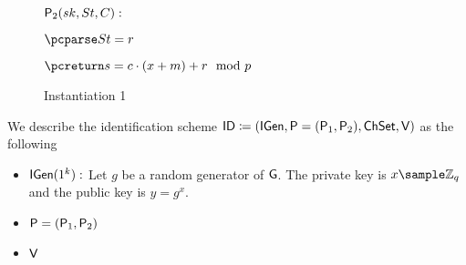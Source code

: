 \begin{figure}[htb!]
{\begin{minipage}[t]{0.5\textwidth}
              \underline{$\mathsf{P}_2(sk,St,C):$}
            \begin{nicodemus}
            	\item $\pcparse \st = r$
                \item $\pcreturn \s = c\cdot(x+m) + r \mod p$
            \end{nicodemus}
        \end{minipage}
    }
    \caption{Instantiation 1}
    \label{fig:prf-security}
\end{figure}

We describe the identification scheme  $\mathsf{ID} \coloneqq(\mathsf{IGen}, \mathsf{P}=(\mathsf{P}_1,\mathsf{P}_2) ,\mathsf{ChSet}, \mathsf{V})$ as the following
\begin{itemize}[label={}]
  \item $\mathsf{IGen}(1^k):$ Let $g$ be a random generator of $\mathsf{G}$. The private key is $x \sample \mathbb{Z}_q$ and the public key is $y = g^x$.
  \item $\mathsf{P}=(\mathsf{P}_1,\mathsf{P}_2)$
  \item $\mathsf{V}$
\end{itemize}



